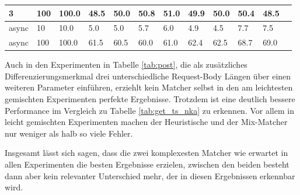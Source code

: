 \documentclass[12pt,a4paper]{report}
\begin{document}
\begin{table}[h]
\begin{tabular}{|l|l|l|l|l|l|l|l|l|l|l|l|}
		3                        & 100                                & 100.0                           & 48.5                        & 50.0                      & 50.8                           & 51.0   & 49.9 & 50.0   & 50.4 & 48.5   \\ \hline
		async                    & 10                                 & 10.0                            & 5.0                         & 5.0                       & 5.7                            & 6.0    & 4.9  & 4.5    & 7.7  & 7.5    \\ \hline
		async                    & 100                                & 100.0                           & 61.5                        & 60.5                      & 60.0                           & 61.0   & 62.4 & 62.5   & 68.7 & 69.0   \\ \hline
	\end{tabular}
\end{table}

Auch in den Experimenten in Tabelle \ref{tab:post}, die als zusätzliches Differenzierungsmerkmal drei unterschiedliche
Request-Body Längen über einen weiteren Parameter einführen, erziehlt kein Matcher selbst in den am leichtesten gemischten
Experimenten perfekte Ergebnisse. Trotzdem ist eine deutlich bessere Performance im Vergleich zu Tabelle \ref{tab:get_ts_nka} zu
erkennen. Vor allem in leicht gemischten Experimenten machen der Heuristische und der Mix-Matcher nur weniger als halb so viele
Fehler.

Insgesamt lässt sich sagen, dass die zwei komplexesten Matcher wie erwartet in allen Experimenten die besten Ergebnisse erzielen,
zwischen den beiden besteht dann aber kein relevanter Unterschied mehr, der in diesen Ergebnissen erkennbar wird.
\end{document}
